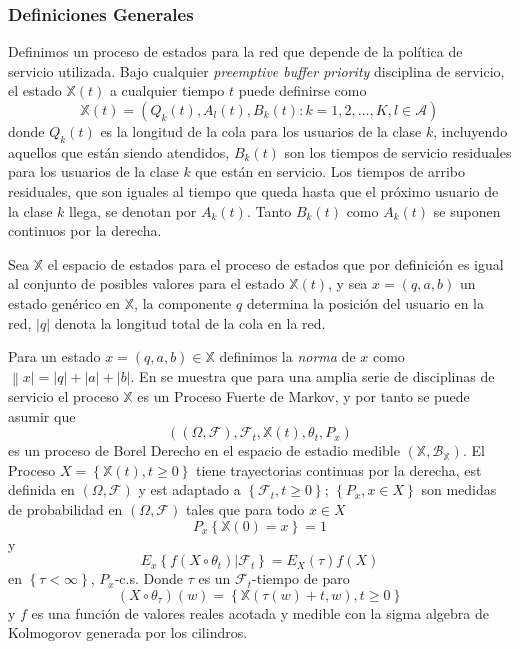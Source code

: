 \subsubsection{Definiciones Generales}
Definimos un proceso de estados para la red que depende de la
pol\'itica de servicio utilizada. Bajo cualquier {\em preemptive
buffer priority} disciplina de servicio, el estado
$\mathbb{X}\left(t\right)$ a cualquier tiempo $t$ puede definirse
como
\begin{equation}\label{Eq.Esp.Estados}
\mathbb{X}\left(t\right)=\left(Q_{k}\left(t\right),A_{l}\left(t\right),B_{k}\left(t\right):k=1,2,\ldots,K,l\in\mathcal{A}\right)
\end{equation}
donde $Q_{k}\left(t\right)$ es la longitud de la cola para los
usuarios de la clase $k$, incluyendo aquellos que est\'an siendo
atendidos, $B_{k}\left(t\right)$ son los tiempos de servicio
residuales para los usuarios de la clase $k$ que est\'an en
servicio. Los tiempos de arribo residuales, que son iguales al
tiempo que queda hasta que el pr\'oximo usuario de la clase $k$
llega, se denotan por $A_{k}\left(t\right)$. Tanto
$B_{k}\left(t\right)$ como $A_{k}\left(t\right)$ se suponen
continuos por la derecha.

Sea $\mathbb{X}$ el espacio de estados para el proceso de estados
que por definici\'on es igual  al conjunto de posibles valores
para el estado $\mathbb{X}\left(t\right)$, y sea
$x=\left(q,a,b\right)$ un estado gen\'erico en $\mathbb{X}$, la
componente $q$ determina la posici\'on del usuario en la red,
$|q|$ denota la longitud total de la cola en la red.

Para un estado $x=\left(q,a,b\right)\in\mathbb{X}$ definimos la
{\em norma} de $x$ como $\left\|x\right|=|q|+|a|+|b|$. En
\cite{Dai} se muestra que para una amplia serie de disciplinas de
servicio el proceso $\mathbb{X}$ es un Proceso Fuerte de Markov, y
por tanto se puede asumir que
\[\left(\left(\Omega,\mathcal{F}\right),\mathcal{F}_{t},\mathbb{X}\left(t\right),\theta_{t},P_{x}\right)\]
es un proceso de Borel Derecho en el espacio de estadio medible
$\left(\mathbb{X},\mathcal{B}_{\mathbb{X}}\right)$. El Proceso
$X=\left\{\mathbb{X}\left(t\right),t\geq0\right\}$ tiene
trayectorias continuas por la derecha, est definida en
$\left(\Omega,\mathcal{F}\right)$ y est adaptado a
$\left\{\mathcal{F}_{t},t\geq0\right\}$; $\left\{P_{x},x\in
X\right\}$ son medidas de probabilidad en
$\left(\Omega,\mathcal{F}\right)$ tales que para todo $x\in X$
\[P_{x}\left\{\mathbb{X}\left(0\right)=x\right\}=1\] y
\[E_{x}\left\{f\left(X\circ\theta_{t}\right)|\mathcal{F}_{t}\right\}=E_{X}\left(\tau\right)f\left(X\right)\]
en $\left\{\tau<\infty\right\}$, $P_{x}$-c.s. Donde $\tau$ es un
$\mathcal{F}_{t}$-tiempo de paro
\[\left(X\circ\theta_{\tau}\right)\left(w\right)=\left\{\mathbb{X}\left(\tau\left(w\right)+t,w\right),t\geq0\right\}\]
y $f$ es una funci\'on de valores reales acotada y medible con la
sigma algebra de Kolmogorov generada por los cilindros.

